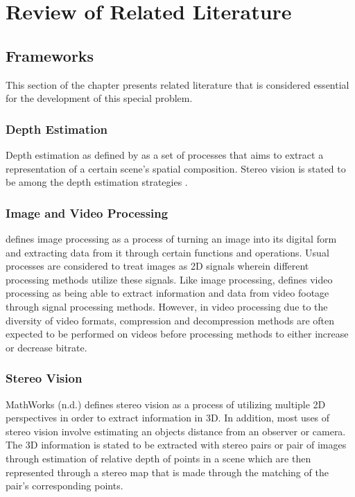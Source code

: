 \chapter{Review of Related Literature}

\section{Frameworks}
This section of the chapter presents related literature that is considered essential for the development of this special problem.

\subsection{Depth Estimation}
Depth estimation as defined by  as a set of processes that aims to extract a representation of a certain scene's spatial composition. Stereo vision is stated to be among the depth estimation strategies \cite{sanz2012}.

\subsection{Image and Video Processing}
 defines image processing as a process of turning an image into its digital form and extracting data from it through certain functions and operations. Usual processes are considered to treat images as 2D signals wherein different processing methods utilize these signals.
Like image processing,  defines video processing as being able to extract information and data from video footage through signal processing methods. However, in video processing due to the diversity of video formats, compression and decompression methods are often expected to be performed on videos before processing methods to either increase or decrease bitrate.

\subsection{Stereo Vision}
MathWorks (n.d.) defines stereo vision as a process of utilizing multiple 2D perspectives in order to extract information in 3D. In addition, most uses of stereo vision involve estimating an objects distance from an observer or camera. The 3D information is stated to be extracted with stereo pairs or pair of images through estimation of relative depth of points in a scene which are then represented through a stereo map that is made through the matching of the pair's corresponding points.


